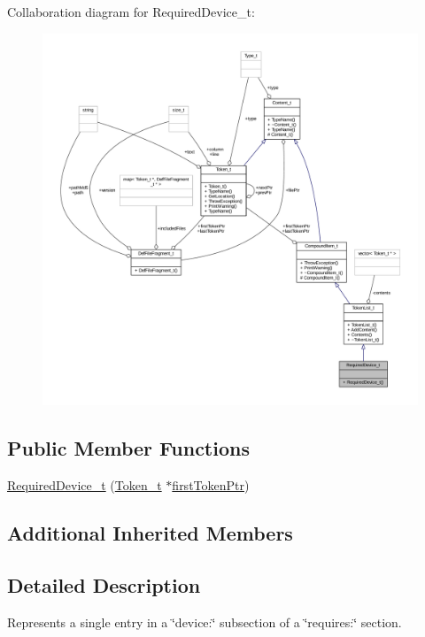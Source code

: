 Collaboration diagram for Required\+Device\+\_\+t\+:
\nopagebreak
\begin{figure}[H]
\begin{center}
\leavevmode
\includegraphics[width=350pt]{struct_required_device__t__coll__graph}
\end{center}
\end{figure}
\subsection*{Public Member Functions}
\begin{DoxyCompactItemize}
\item 
\hyperlink{struct_required_device__t_a6d1395ae8fd1c830975bdce5fb2c1b8c}{Required\+Device\+\_\+t} (\hyperlink{struct_token__t}{Token\+\_\+t} $\ast$\hyperlink{struct_compound_item__t_a4d95dc788120f627e332491589d20c5c}{first\+Token\+Ptr})
\end{DoxyCompactItemize}
\subsection*{Additional Inherited Members}


\subsection{Detailed Description}
Represents a single entry in a \char`\"{}device\+:\char`\"{} subsection of a \char`\"{}requires\+:\char`\"{} section. 

